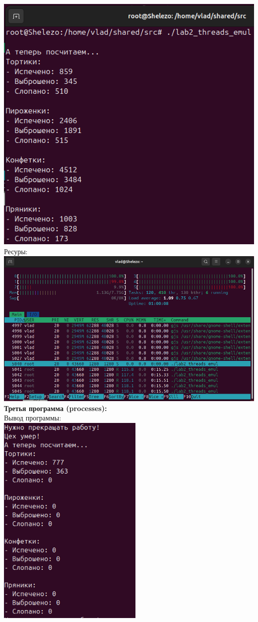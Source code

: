 \documentclass[a4paper,14pt]{extarticle}
\begin{document}
\includegraphics[width=140mm]{threads_emul_output_6}\\
Ресуры:\\
\includegraphics[width=140mm]{threads_emul_resources_6}\\
\textbf{Третья программа (processes):}\\
Вывод программы:\\
\includegraphics[width=70mm]{processes_output_6_1}
\end{document}
